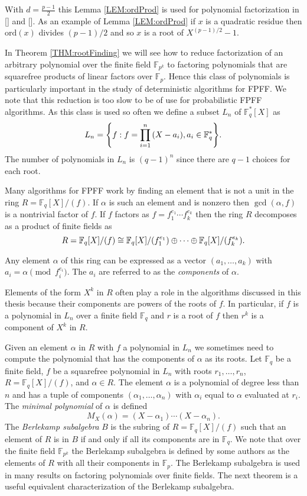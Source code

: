 \documentclass{article}
\let\originalleft\left
\let\originalright\right
\renewcommand{\left}{\mathopen{}\mathclose\bgroup\originalleft}
\renewcommand{\right}{\aftergroup\egroup\originalright}
\theoremstyle{plain}
\theoremstyle{definition}
\def\Fp {{ \mathbb{F} _ {p} }}
\def\Fq {{ \mathbb{F} _ {q} }}
\def\FQ {{ \mathbb{F}^* _ {q} }}
\def\FpE {{ \mathbb{F} _ {p^k} }}
\def\ord {{ \mathrm{ord} }}
\begin{document}
		With $d=\frac{p-1}{2}$ this Lemma \ref{LEM:ordProd} is used for polynomial factorization in [] and []. As an example of Lemma \ref{LEM:ordProd} if $x$ is a quadratic residue then $\ord(x)$ divides $(p-1)/2$ and so $x$ is a root of $X^{(p-1)/2}-1$. 
		
		In Theorem \ref{THM:rootFinding} we will see how to reduce factorization of an arbitrary polynomial over the finite field $\mathbb{F}_{p^k}$ to factoring polynomials that are squarefree products of linear factors over $\Fp$. Hence this class of polynomials is particularly important in the study of deterministic algorithms for FPFF. We note that this reduction is too slow to be of use for probabilistic FPFF algorithms. As this class is used so often we define a subset  $L_n$ of $\FQ[X]$ as
		\[ L_n=\left\{ f : f=\prod_{i=1}^n{(X-a_i)} , a_i \in \FQ \right\}. \]
		The number of polynomials in $L_n$ is $(q-1)^n$ since there are $q-1$ choices for each root. 
		
		Many algorithms for FPFF work by finding an element that is not a unit in the ring $R=\Fq[X]/(f)$. If $\alpha$ is such an element and is nonzero then $\gcd(\alpha,f)$ is a nontrivial factor of $f$. If $f$ factors as $f=f_1^{e_1} \cdots f_k^{e_k}$ then the ring $R$ decomposes as a product of finite fields as
		\[R = \Fq[X]/(f) \cong \Fq[X]/\left(f_1^{e_1}\right) \oplus \cdots \oplus \Fq[X]/\left(f_k^{e_k}\right). \]
	
		Any element $\alpha$ of this ring can be expressed as a vector $(a_1,\ldots, a_k)$ with $a_i = \alpha \pmod {f_i^{e_i}}$. The $a_i$ are referred to as the \emph{components} of $\alpha$. 
		
		Elements of the form $X^k$ in $R$ often play a role in the algorithms discussed in this thesis because their components are powers of the roots of $f$. In particular, if $f$ is a polynomial in $L_n$ over a finite field $\Fq$ and $r$ is a root of $f$ then $r^k$ is a component of $X^k$ in $R$. 
			
		Given an element $\alpha$ in $R$ with $f$ a polynomial in $L_n$ we sometimes need to compute the polynomial that has the components of $\alpha$ as its roots. Let $\Fq$ be a finite field, $f$ be a squarefree polynomial in $L_n$ with roots $r_1,\ldots,r_n$, $R=\Fq[X]/(f)$, and $\alpha \in R$. The element $\alpha$ is a polynomial of degree less than $n$ and has a tuple of components $(\alpha_1,\ldots,\alpha_n)$ with $\alpha_i$ equal to $\alpha$ evaluated at $r_i$. The \emph{minimal polynomial} of $\alpha$ is defined 
		\[ M_{X}(\alpha)=(X-\alpha_1) \cdots (X-\alpha_n) .\]
		The \emph{Berlekamp subalgebra} $B$ is the subring of $R=\Fq[X]/(f)$ such that an element of $R$ is in $B$ if and only if all its components are in $\Fq$. We note that over the finite field $\FpE$ the Berlekamp subalgebra is defined by some authors as the elements of $R$ with all their components in $\Fp$. The Berlekamp subalgebra is used in many results on factoring polynomials over finite fields. The next theorem is a useful equivalent characterization of the Berlekamp subalgebra. 
				
\end{document}
